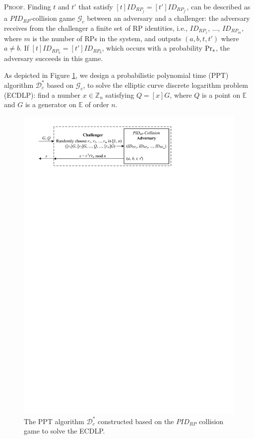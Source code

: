 \oldc
\noindent\textsc{Proof.}
Finding $t$ and $t'$ that satisfy $[t]ID_{RP_j} = [t']ID_{RP_{j'}}$, can be described as a $PID_{RP}$-collision game $\mathcal{G}_c$ between an adversary and a challenger: the adversary receives from the challenger a finite set of RP identities, i.e., $ID_{RP_1}$, ..., $ID_{RP_m}$, where $m$ is the number of RPs in the system, and outputs $(a, b, t, t')$ where $a \neq b$. If $[t]ID_{RP_a}=[t']ID_{RP_b}$, which occurs with a probability ${\rm Pr}_s$, the adversary succeeds in this game.

As depicted in Figure \ref{fig:ecdlp_algorithm}, we design a probabilistic polynomial time (PPT) algorithm $\mathcal{D}^*_c$ based on $\mathcal{G}_c$, to solve the elliptic curve discrete logarithm problem (ECDLP): find a number $x \in \mathbb{Z}_n$ satisfying $Q = [x]G$, where $Q$ is a point on $\mathbb{E}$ and $G$ is a generator on $\mathbb{E}$ of order $n$.


\begin{figure}[tb]
  \centering
  \includegraphics[width=0.96\linewidth]{fig/ecdlp_algorithm.pdf}
  \caption{The PPT algorithm $\mathcal{D}^*_c$ constructed based on the $PID_{RP}$ collision game to solve the ECDLP.}
  \label{fig:ecdlp_algorithm}
\end{figure}


